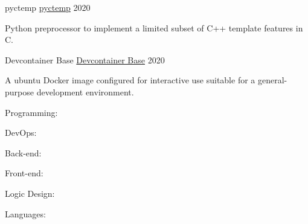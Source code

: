 \documentclass[11pt, a4paper]{cv}
\begin{document}
\begin{cv}
\begin{projects}
\begin{cventries}
\cventrycompact
{
{pyctemp}
{\color{hrefblue}\href{https://github.com/brandonmosher/pyctemp}{pyctemp}}}
{}
{}
{2020}
{\begin{cvparagraph}
Python preprocessor to implement a limited subset of C++ template features in C.
\end{cvparagraph}}
\cventrycompact
{
{Devcontainer Base}
{\color{hrefblue}\href{https://github.com/brandonmosher/devcontainer-base}{Devcontainer Base}}}
{}
{}
{2020}
{\begin{cvparagraph}
A ubuntu Docker image configured for interactive use suitable for a general-purpose development environment.
\end{cvparagraph}}
\end{cventries}
\end{projects}
\begin{skillsets}
\begin{cventries}
\titledItem
{Programming:}
{\begin{skills}
%
%
%
%
%
%
%
%
%
\end{skills}}
\par
\titledItem
{DevOps:}
{\begin{skills}
%
%
%
%
%
\end{skills}}
\par
\titledItem
{Back-end:}
{\begin{skills}
%
%
%
\end{skills}}
\par
\titledItem
{Front-end:}
{\begin{skills}
%
%
%
\end{skills}}
\par
\titledItem
{Logic Design:}
{\begin{skills}
%
%
%
\end{skills}}
\par
\titledItem
{Languages:}
{\begin{skills}
%
\end{skills}}

\end{cventries}
\end{skillsets}
\end{cv}
\end{document}
